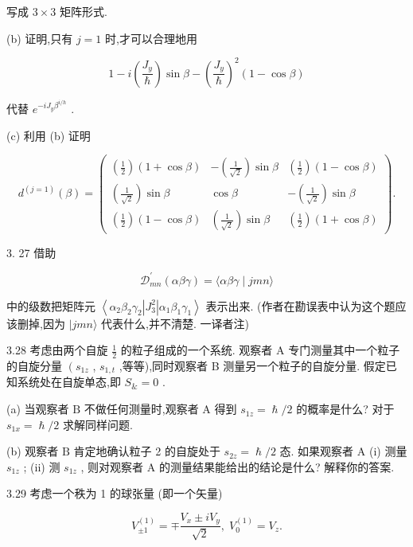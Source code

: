 写成 $3 \times 3$ 矩阵形式.

(b) 证明,只有 $j = 1$ 时,才可以合理地用

$$
1 - i\left( \frac{{J}_{y}}{\hslash }\right) \sin \beta - {\left( \frac{{J}_{y}}{\hslash }\right) }^{2}\left( {1 - \cos \beta }\right)
$$

代替 ${e}^{-i{J}_{y}{\beta }^{i/h}}$ .

(c) 利用 (b) 证明

$$
{d}^{\left( j = 1\right) }\left( \beta \right) = \left( \begin{matrix} \left( \frac{1}{2}\right) \left( {1 + \cos \beta }\right) & - \left( \frac{1}{\sqrt{2}}\right) \sin \beta & \left( \frac{1}{2}\right) \left( {1 - \cos \beta }\right) \\ \left( \frac{1}{\sqrt{2}}\right) \sin \beta & \cos \beta & - \left( \frac{1}{\sqrt{2}}\right) \sin \beta \\ \left( \frac{1}{2}\right) \left( {1 - \cos \beta }\right) & \left( \frac{1}{\sqrt{2}}\right) \sin \beta & \left( \frac{1}{2}\right) \left( {1 + \cos \beta }\right) \end{matrix}\right) .
$$

3. 27 借助

$$
{\mathcal{D}}_{mn}^{\prime }\left( {\alpha \beta \gamma }\right) = \langle {\alpha \beta \gamma } \mid {jmn}\rangle
$$

中的级数把矩阵元 $\left\langle {{\alpha }_{2}{\beta }_{2}{\gamma }_{2}\left| {J}_{3}^{2}\right| {\alpha }_{1}{\beta }_{1}{\gamma }_{1}}\right\rangle$ 表示出来. (作者在勘误表中认为这个题应该删掉,因为 $|{jmn}\rangle$ 代表什么,并不清楚. 一译者注)

3.28 考虑由两个自旋 $\frac{1}{2}$ 的粒子组成的一个系统. 观察者 $\mathrm{A}$ 专门测量其中一个粒子的自旋分量 $\left( {s}_{1z}\right.$ , ${s}_{1, t}$ ,等等),同时观察者 B 测量另一个粒子的自旋分量. 假定已知系统处在自旋单态,即 ${S}_{\& } = 0$ .

(a) 当观察者 $\mathrm{B}$ 不做任何测量时,观察者 $\mathrm{A}$ 得到 ${s}_{1z} = \hslash /2$ 的概率是什么? 对于 ${s}_{1x} = \hslash /2$ 求解同样问题.

(b) 观察者 $\mathrm{B}$ 肯定地确认粒子 2 的自旋处于 ${s}_{2z} = \hslash /2$ 态. 如果观察者 $\mathrm{A}$ (i) 测量 ${s}_{1z}$ ; (ii) 测 ${s}_{1z}$ , 则对观察者 $\mathrm{A}$ 的测量结果能给出的结论是什么? 解释你的答案.

3.29 考虑一个秩为 1 的球张量 (即一个矢量)

$$
{V}_{\pm 1}^{\left( 1\right) } = \mp \frac{{V}_{x} \pm i{V}_{y}}{\sqrt{2}},\;{V}_{0}^{\left( 1\right) } = {V}_{z}.
$$

